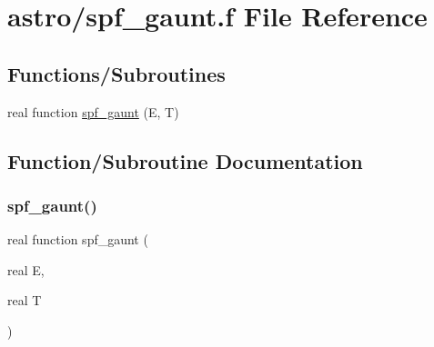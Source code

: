 \hypertarget{spf__gaunt_8f}{}\section{astro/spf\+\_\+gaunt.f File Reference}
\label{spf__gaunt_8f}
\subsection*{Functions/\+Subroutines}
\begin{DoxyCompactItemize}
\item 
real function \hyperlink{spf__gaunt_8f_a22bbd19ac602d78c584b5042182747f6}{spf\+\_\+gaunt} (E, T)
\end{DoxyCompactItemize}


\subsection{Function/\+Subroutine Documentation}
\mbox{\label{spf__gaunt_8f_a22bbd19ac602d78c584b5042182747f6}} 
\subsubsection{\texorpdfstring{spf\+\_\+gaunt()}{spf\_gaunt()}}
{\footnotesize\ttfamily real function spf\+\_\+gaunt (\begin{DoxyParamCaption}\item[{real}]{E,  }\item[{real}]{T }\end{DoxyParamCaption})}


